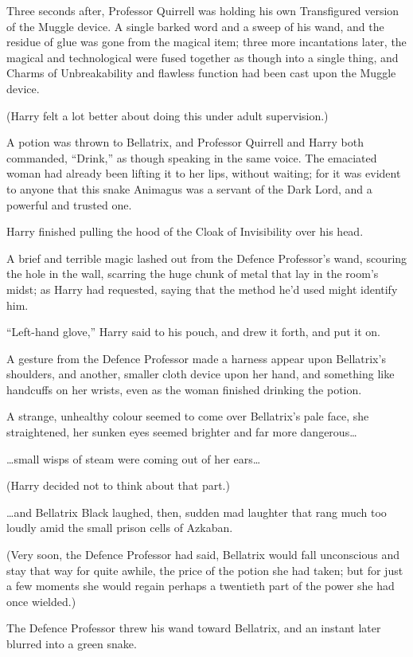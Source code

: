 Three seconds after, Professor Quirrell was holding his own Transfigured version of the Muggle device. A single barked word and a sweep of his wand, and the residue of glue was gone from the magical item; three more incantations later, the magical and technological were fused together as though into a single thing, and Charms of Unbreakability and flawless function had been cast upon the Muggle device.

(Harry felt a lot better about doing this under adult supervision.)

A potion was thrown to Bellatrix, and Professor Quirrell and Harry both commanded, “Drink,” as though speaking in the same voice. The emaciated woman had already been lifting it to her lips, without waiting; for it was evident to anyone that this snake Animagus was a servant of the Dark Lord, and a powerful and trusted one.

Harry finished pulling the hood of the Cloak of Invisibility over his head.

A brief and terrible magic lashed out from the Defence Professor’s wand, scouring the hole in the wall, scarring the huge chunk of metal that lay in the room’s midst; as Harry had requested, saying that the method he’d used might identify him.

“Left-hand glove,” Harry said to his pouch, and drew it forth, and put it on.

A gesture from the Defence Professor made a harness appear upon Bellatrix’s shoulders, and another, smaller cloth device upon her hand, and something like handcuffs on her wrists, even as the woman finished drinking the potion.

A strange, unhealthy colour seemed to come over Bellatrix’s pale face, she straightened, her sunken eyes seemed brighter and far more dangerous…

…small wisps of steam were coming out of her ears…

(Harry decided not to think about that part.)

…and Bellatrix Black laughed, then, sudden mad laughter that rang much too loudly amid the small prison cells of Azkaban.

(Very soon, the Defence Professor had said, Bellatrix would fall unconscious and stay that way for quite awhile, the price of the potion she had taken; but for just a few moments she would regain perhaps a twentieth part of the power she had once wielded.)

The Defence Professor threw his wand toward Bellatrix, and an instant later blurred into a green snake.

